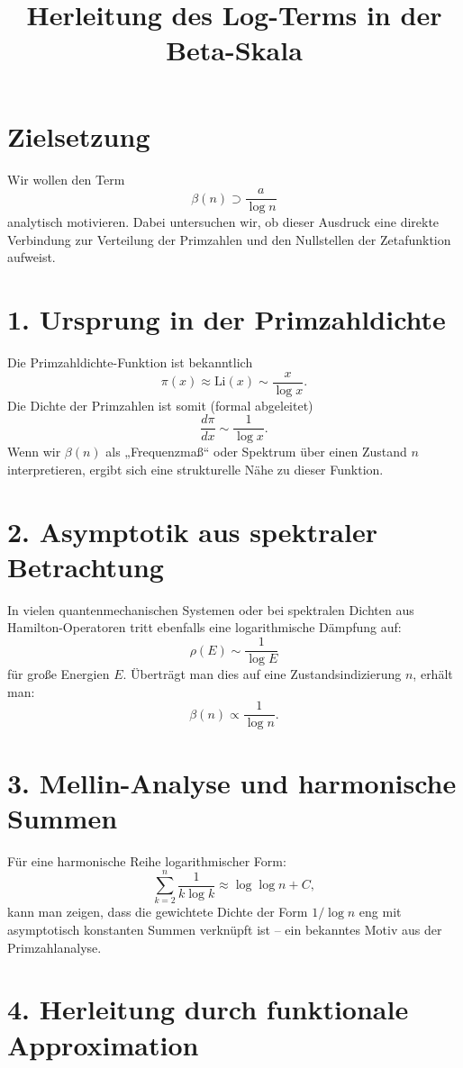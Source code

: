 \documentclass[a4paper,12pt]{article}
\title{Herleitung des Log-Terms in der Beta-Skala}
\author{}
\date{}
\begin{document}
\maketitle

\section*{Zielsetzung}

Wir wollen den Term
\[
\beta(n) \supset \frac{a}{\log n}
\]
analytisch motivieren. Dabei untersuchen wir, ob dieser Ausdruck eine direkte Verbindung zur Verteilung der Primzahlen und den Nullstellen der Zetafunktion aufweist.

\section*{1. Ursprung in der Primzahldichte}

Die Primzahldichte-Funktion ist bekanntlich
\[
\pi(x) \approx \text{Li}(x) \sim \frac{x}{\log x}.
\]
Die Dichte der Primzahlen ist somit (formal abgeleitet)
\[
\frac{d\pi}{dx} \sim \frac{1}{\log x}.
\]
Wenn wir \(\beta(n)\) als „Frequenzmaß“ oder Spektrum über einen Zustand \(n\) interpretieren, ergibt sich eine strukturelle Nähe zu dieser Funktion.

\section*{2. Asymptotik aus spektraler Betrachtung}

In vielen quantenmechanischen Systemen oder bei spektralen Dichten aus Hamilton-Operatoren tritt ebenfalls eine logarithmische Dämpfung auf:
\[
\rho(E) \sim \frac{1}{\log E}
\]
für große Energien \(E\). Überträgt man dies auf eine Zustandsindizierung \(n\), erhält man:
\[
\beta(n) \propto \frac{1}{\log n}.
\]

\section*{3. Mellin-Analyse und harmonische Summen}

Für eine harmonische Reihe logarithmischer Form:
\[
\sum_{k=2}^n \frac{1}{k \log k} \approx \log \log n + C,
\]
kann man zeigen, dass die gewichtete Dichte der Form \(1/\log n\) eng mit asymptotisch konstanten Summen verknüpft ist – ein bekanntes Motiv aus der Primzahlanalyse.

\section*{4. Herleitung durch funktionale Approximation}
\end{document}
